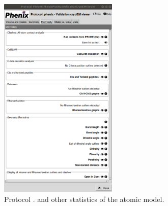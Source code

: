 \begin{itemize}
\begin{itemize}
\begin{figure}[H]
         \includegraphics[width=0.50\textwidth]{Images_appendix/Fig202.pdf}
         \caption{Protocol . \molprobity and other statistics of the atomic model.}
         \label{fig:validationCryoEM_protocol_4}
        \end{figure}
        

\end{itemize}
\end{itemize}
